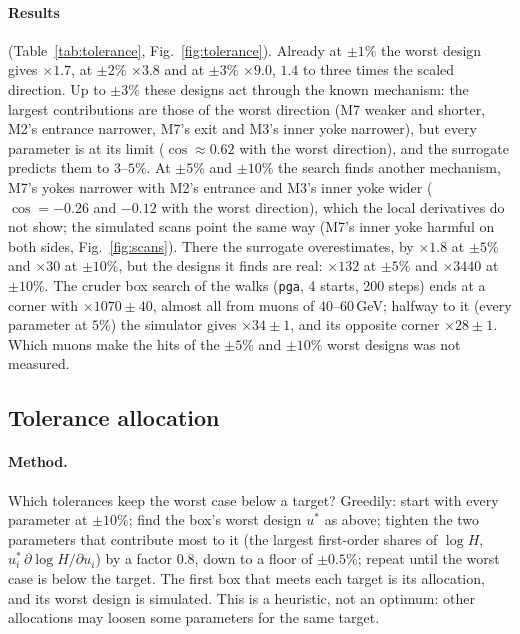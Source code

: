 \documentclass[11pt,a4paper]{article}
\begin{document}
\paragraph{Results} (Table~\ref{tab:tolerance}, Fig.~\ref{fig:tolerance}). Already at $\pm1\%$
the worst design gives $\times1.7$, at $\pm2\%$ $\times3.8$ and at $\pm3\%$ $\times9.0$, $1.4$ to
three times the scaled direction. Up to $\pm3\%$ these designs act through the known mechanism:
the largest contributions are those of the worst direction (M7 weaker and shorter, M2's entrance
narrower, M7's exit and M3's inner yoke narrower), but every parameter is at its limit
($\cos\approx0.62$ with the worst direction), and the surrogate predicts them to $3$--$5\%$. At
$\pm5\%$ and $\pm10\%$ the search finds another mechanism, M7's yokes narrower with M2's entrance
and M3's inner yoke wider ($\cos=-0.26$ and $-0.12$ with the worst direction), which the local
derivatives do not show; the simulated scans point the same way (M7's inner yoke harmful on both
sides, Fig.~\ref{fig:scans}). There the surrogate overestimates, by $\times1.8$ at $\pm5\%$ and
$\times30$ at $\pm10\%$, but the designs it finds are real: $\times132$ at $\pm5\%$ and $\times3440$
at $\pm10\%$. The cruder box search of the walks (\texttt{pga}, 4 starts, 200 steps) ends at a
corner with $\times1070\pm40$, almost all from muons of $40$--$60$\,GeV; halfway to it (every
parameter at $5\%$) the simulator gives $\times34\pm1$, and its opposite corner $\times28\pm1$.
Which muons make the hits of the $\pm5\%$ and $\pm10\%$ worst designs was not measured.

\subsection{Tolerance allocation}
\label{sec:allocation}

\paragraph{Method.} Which tolerances keep the worst case below a target? Greedily: start with
every parameter at $\pm10\%$; find the box's worst design $u^*$ as above; tighten the two
parameters that contribute most to it (the largest first-order shares of $\log H$,
$u^*_i\,\partial\log H/\partial u_i$) by a factor $0.8$, down to a floor of $\pm0.5\%$; repeat
until the worst case is below the target. The first box that meets each target is its
allocation, and its worst design is simulated. This is a heuristic, not an optimum: other
allocations may loosen some parameters for the same target.
\end{document}
